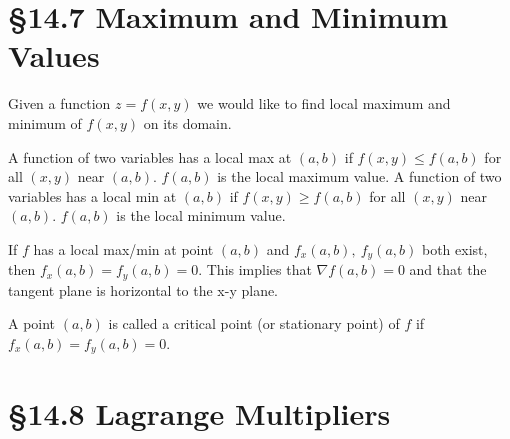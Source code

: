 \documentclass[12 pt]{article}
\begin{document}
    \section{\S 14.7 Maximum and Minimum Values}
        Given a function $z=f(x,y)$ we would like to find local maximum and minimum of $f(x,y)$ on its domain.

        \begin{def*}
            A function of two variables has a local max at $(a,b)$ if $f(x,y)\leq f(a,b)$ for all $(x,y)$ near $(a,b)$. $f(a,b)$ is the local maximum value. A function of two variables has a local min at $(a,b)$ if $f(x,y)\geq f(a,b)$ for all $(x,y)$ near $(a,b)$. $f(a,b)$ is the local minimum value.
        \end{def*}
        \begin{thrm}
            If $f$ has a local max/min at point $(a,b)$ and $f_x(a,b),\ f_y(a,b)$ both exist, then $f_x(a,b)=f_y(a,b)=0$. This implies that $\nabla f(a,b)=0$ and that the tangent plane is horizontal to the x-y plane.
        \end{thrm}
        \begin{def*}
            A point $(a,b)$ is called a critical point (or stationary point) of $f$ if $f_x(a,b)=f_y(a,b)=0$.
        \end{def*}
    \section{\S 14.8 Lagrange Multipliers}
\end{document}
